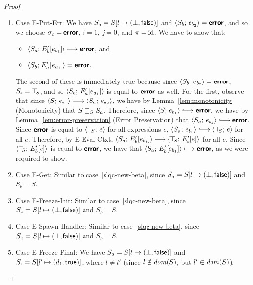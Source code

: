 \begin{proof}
\begin{enumerate}
\begin{enumerate}
    \item \label{slqc-new-put-err}Case {\sc E-Put-Err}: We have $S_a =
      S[l \mapsto (\bot, \textsf{false})]$ and $\langle S_b;\, e_{b_2} \rangle =
      \textbf{\textsf{error}}$, and so we choose $\sigma_c = \textbf{\textsf{error}}$, $i = 1$, $j = 0$,
      and $\pi = \mathrm{id}$.  We have to show that:
      \begin{itemize}
      \item $\langle S_a;\, E'_b\hspace{-0.5mm}\left[e_{b_1}\right] \rangle \longmapsto
        \textbf{\textsf{error}}$, and
      \item $\langle S_b;\, E'_a\hspace{-0.5mm}\left[e_{a_1}\right] \rangle = \textbf{\textsf{error}}$.
      \end{itemize}

      The second of these is immediately true because since
      $\langle S_b;\, e_{b_2} \rangle = \textbf{\textsf{error}}$, $S_b = \top\hspace{-0.85mm}_{S}$, and so
      $\langle S_b;\, E'_a\hspace{-0.5mm}\left[e_{a_1}\right] \rangle$ is equal to $\textbf{\textsf{error}}$ as
      well.  For the first, observe that since $\config{S}{e_{a_1}}
      \parstepsto \config{S_a}{e_{a_2}}$, we have by
      Lemma~\ref{lem:monotonicity} (Monotonicity) that
      $S \sqsubseteq_S S_a$.  Therefore, since $\config{S}{e_{b_1}}
      \parstepsto \error$, we have by
      Lemma~\ref{lem:error-preservation} (Error Preservation) that
      $\config{S_a}{e_{b_1}} \parstepsto \error$.  Since $\textbf{\textsf{error}}$ is
      equal to $\langle \top\hspace{-0.85mm}_{S};\, e \rangle$ for all expressions $e$,
      $\config{S_a}{e_{b_1}} \parstepsto \config{\topS}{e}$ for all
      $e$.  Therefore, by {\sc E-Eval-Ctxt},
      $\langle S_a;\, E'_b\hspace{-0.5mm}\left[e_{b_1}\right] \rangle \longmapsto
      \langle \top\hspace{-0.85mm}_{S};\, E'_b\hspace{-0.5mm}\left[e\right] \rangle$ for all $e$.  Since
      $\langle \top\hspace{-0.85mm}_{S};\, E'_b\hspace{-0.5mm}\left[e\right] \rangle$ is equal to $\textbf{\textsf{error}}$, we
      have that $\langle S_a;\, E'_b\hspace{-0.5mm}\left[e_{b_1}\right] \rangle \longmapsto
      \textbf{\textsf{error}}$, as we were required to show.

    \item \label{slqc-new-get}Case {\sc E-Get}: Similar to
      case~\ref{slqc-new-beta}, since $S_a =
      S[l \mapsto (\bot, \textsf{false})]$ and $S_b = S$.
    \item \label{slqc-new-freeze-init}Case {\sc E-Freeze-Init}:
      Similar to case~\ref{slqc-new-beta}, since $S_a =
      S[l \mapsto (\bot, \textsf{false})]$ and $S_b = S$.
    \item \label{slqc-new-spawn-handler}Case {\sc E-Spawn-Handler}:
      Similar to case~\ref{slqc-new-beta}, since $S_a =
      S[l \mapsto (\bot, \textsf{false})]$ and $S_b = S$.
    \item \label{slqc-new-freeze-final}Case {\sc E-Freeze-Final}: We
      have $S_a = S[l \mapsto (\bot, \textsf{false})]$ and $S_b =
      S[l' \mapsto (d_1, \textsf{true})]$, where $l \neq l'$ (since $l
      \notin \mathit{dom}(S)$, but $l' \in \mathit{dom}(S)$).


\end{enumerate}
\end{enumerate}
\end{proof}
